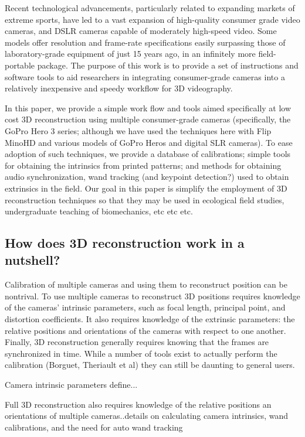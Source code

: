 \documentclass[fleqn,10pt]{wlpeerj}
\begin{document}
Recent technological advancements, particularly related to expanding markets of extreme sports, have led to a vast expansion of high-quality consumer grade video cameras, and DSLR cameras capable of moderately high-speed video.  Some models offer resolution and frame-rate specifications easily surpassing those of laboratory-grade equipment of just 15 years ago, in an infinitely more field-portable package.  The purpose of this work is to provide a set of instructions and software tools to aid researchers in integrating consumer-grade cameras into a relatively inexpensive and speedy workflow for 3D videography.  

In this paper, we provide a simple work flow and tools aimed specifically at low cost 3D reconstruction using multiple consumer-grade cameras (specifically, the GoPro Hero 3 series; although we have used the techniques here with Flip MinoHD and various models of GoPro Heros and digital SLR cameras).  To ease adoption of such techniques, we provide a database of calibrations; simple tools for obtaining the intrinsics from printed patterns; and methods for obtaining audio synchronization, wand tracking (and keypoint detection?) used to obtain extrinsics in the field. Our goal in this paper is simplify the employment of 3D reconstruction techniques so that they may be used in ecological field studies, undergraduate teaching of biomechanics, etc etc etc. 

\subsection*{How does 3D reconstruction work in a nutshell?}
Calibration of multiple cameras and using them to reconstruct position can be nontrival.  To use multiple cameras to reconstruct 3D positions requires knowledge of the cameras' intrinsic parameters, such as focal length, principal point, and distortion coefficients.  It also requires knowledge of the extrinsic parameters: the relative positions and orientations of the cameras with respect to one another. Finally, 3D reconstruction generally requires knowing that the frames are synchronized in time.  While a number of tools exist to actually perform the calibration (Borguet, Theriault et al) they can still be daunting to general users.

Camera intrinsic parameters define...

Full 3D reconstruction also requires knowledge of the relative positions an orientations of multiple cameras..details on calculating camera intrinsics, wand calibrations, and the need for auto wand tracking
\end{document}
